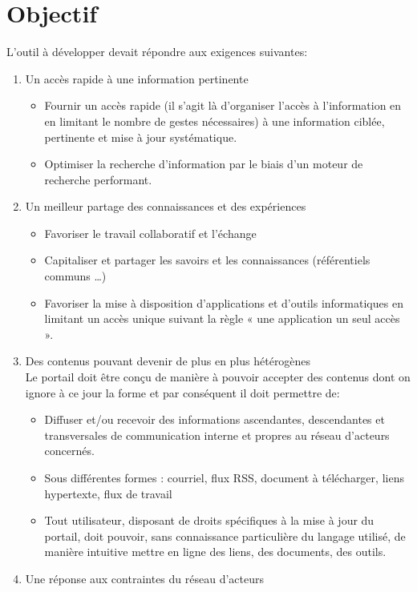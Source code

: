 \section{Objectif}
L'outil à développer devait répondre aux exigences suivantes:
\begin{enumerate}
\item Un accès rapide à une information pertinente
\begin{itemize}
\item Fournir un accès rapide (il s'agit là d'organiser l'accès à l'information en en limitant le
nombre de gestes nécessaires) à une information ciblée, pertinente et mise à jour systématique.
\item Optimiser la recherche d'information par le biais d'un moteur de recherche performant.
\end{itemize}
\item Un meilleur partage des connaissances et des expériences
\begin{itemize}
\item Favoriser le travail collaboratif et l'échange
\item Capitaliser et partager les savoirs et les connaissances (référentiels communs …)
\item Favoriser la mise à disposition d'applications et d'outils informatiques en limitant un accès
unique suivant la règle « une application un seul accès ».
\end{itemize}
\item Des contenus pouvant devenir de plus en plus hétérogènes\\
Le portail doit être conçu de manière à pouvoir accepter des contenus dont on ignore à ce jour la
forme et par conséquent il doit permettre de:
\begin{itemize}
\item Diffuser et/ou recevoir des informations ascendantes, descendantes et transversales de
communication interne et propres au réseau d'acteurs concernés.
\item Sous différentes formes : courriel, flux RSS, document à télécharger, liens hypertexte, flux de
travail
\item Tout utilisateur, disposant de droits spécifiques à la mise à jour du portail, doit pouvoir, sans
connaissance particulière du langage utilisé, de manière intuitive mettre en ligne des liens, des
documents, des outils.
\end{itemize}
\item Une réponse aux contraintes du réseau d'acteurs

\end{enumerate}
